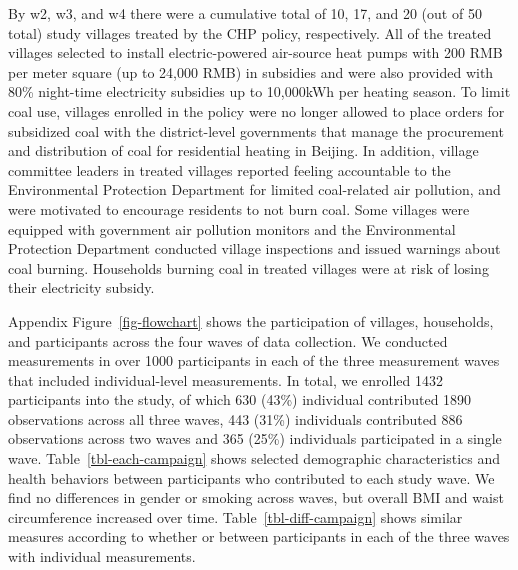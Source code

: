 \documentclass[
  letterpaper,
  DIV=11,
  numbers=noendperiod]{scrartcl}
\begin{document}
By w2, w3, and w4 there were a cumulative total of 10, 17, and 20 (out
of 50 total) study villages treated by the CHP policy, respectively. All
of the treated villages selected to install electric-powered air-source
heat pumps with 200 RMB per meter square (up to 24,000 RMB) in subsidies
and were also provided with 80\% night-time electricity subsidies up to
10,000kWh per heating season. To limit coal use, villages enrolled in
the policy were no longer allowed to place orders for subsidized coal
with the district-level governments that manage the procurement and
distribution of coal for residential heating in Beijing. In addition,
village committee leaders in treated villages reported feeling
accountable to the Environmental Protection Department for limited
coal-related air pollution, and were motivated to encourage residents to
not burn coal. Some villages were equipped with government air pollution
monitors and the Environmental Protection Department conducted village
inspections and issued warnings about coal burning. Households burning
coal in treated villages were at risk of losing their electricity
subsidy.

Appendix Figure~\ref{fig-flowchart} shows the participation of villages,
households, and participants across the four waves of data collection.
We conducted measurements in over 1000 participants in each of the three
measurement waves that included individual-level measurements. In total,
we enrolled 1432 participants into the study, of which 630 (43\%)
individual contributed 1890 observations across all three waves, 443
(31\%) individuals contributed 886 observations across two waves and 365
(25\%) individuals participated in a single wave.
Table~\ref{tbl-each-campaign} shows selected demographic characteristics
and health behaviors between participants who contributed to each study
wave. We find no differences in gender or smoking across waves, but
overall BMI and waist circumference increased over time.
Table~\ref{tbl-diff-campaign} shows similar measures according to
whether or between participants in each of the three waves with
individual measurements.
\end{document}
